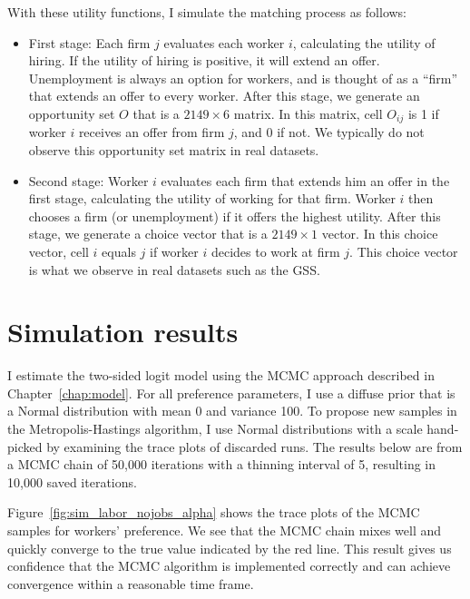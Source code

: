 With these utility functions, I simulate the matching process as follows:

\begin{itemize}
\item{First stage:} Each firm $j$ evaluates each worker $i$, calculating the
  utility of hiring. If the utility of hiring is positive, it will extend an
  offer. Unemployment is always an option for workers, and is thought of as a
  ``firm'' that extends an offer to every worker. After this stage, we generate
  an opportunity set $O$ that is a $2149 \times 6$ matrix. In this matrix, cell
  $O_{ij}$ is 1 if worker $i$ receives an offer from firm $j$, and 0 if not. We
  typically do not observe this opportunity set matrix in real datasets.
\item{Second stage:} Worker $i$ evaluates each firm that extends him an offer in
  the first stage, calculating the utility of working for that firm. Worker $i$
  then chooses a firm (or unemployment) if it offers the highest utility. After
  this stage, we generate a choice vector that is a $2149 \times 1$ vector. In
  this choice vector, cell $i$ equals $j$ if worker $i$ decides to work at firm
  $j$. This choice vector is what we observe in real datasets such as the GSS.
\end{itemize}

\section{Simulation results}

I estimate the two-sided logit model using the MCMC approach described in
Chapter~\ref{chap:model}. For all preference parameters, I use a diffuse prior
that is a Normal distribution with mean 0 and variance 100. To propose new samples in the
Metropolis-Hastings algorithm, I use Normal distributions with a scale
hand-picked by examining the trace plots of discarded runs. The results below
are from a MCMC chain of 50,000 iterations with a thinning interval of 5,
resulting in 10,000 saved iterations.

Figure~\ref{fig:sim_labor_nojobs_alpha} shows the trace plots of the MCMC
samples for workers' preference. We see that the MCMC chain mixes well and
quickly converge to the true value indicated by the red line. This result gives
us confidence that the MCMC algorithm is implemented correctly and can achieve
convergence within a reasonable time frame.

